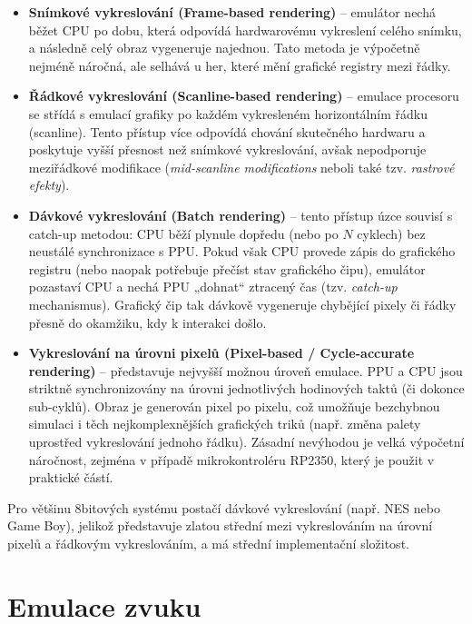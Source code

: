 \begin{itemize}
    \item \textbf{Snímkové vykreslování (Frame-based rendering)} -- emulátor nechá běžet CPU po
        dobu, která odpovídá hardwarovému vykreslení celého snímku, a následně celý obraz vygeneruje
        najednou. Tato metoda je výpočetně nejméně náročná, ale selhává u her, které mění grafické
        registry mezi řádky.
    \item \textbf{Řádkové vykreslování (Scanline-based rendering)} -- emulace procesoru se střídá s
        emulací grafiky po každém vykresleném horizontálním řádku (scanline). Tento přístup více
        odpovídá chování skutečného hardwaru a poskytuje vyšší přesnost než snímkové vykreslování,
        avšak nepodporuje meziřádkové modifikace (\textit{mid-scanline modifications} neboli také
        tzv. \emph{rastrové efekty}).
    \item \textbf{Dávkové vykreslování (Batch rendering)} -- tento přístup úzce souvisí s catch-up
        metodou: CPU běží plynule dopředu (nebo po $N$ cyklech) bez neustálé synchronizace s
        PPU. Pokud však CPU provede zápis do grafického registru (nebo naopak potřebuje přečíst stav
        grafického čipu), emulátor pozastaví CPU a nechá PPU „dohnat“ ztracený čas (tzv.
        \textit{catch-up} mechanismus). Grafický čip tak dávkově vygeneruje chybějící pixely či
        řádky přesně do okamžiku, kdy k interakci došlo.
    \item \textbf{Vykreslování na úrovni pixelů (Pixel-based / Cycle-accurate rendering)} --
        představuje nejvyšší možnou úroveň emulace. PPU a CPU jsou striktně synchronizovány na
        úrovni jednotlivých hodinových taktů (či dokonce sub-cyklů). Obraz je generován pixel po
        pixelu, což umožňuje bezchybnou simulaci i těch nejkomplexnějších grafických triků (např.
        změna palety uprostřed vykreslování jednoho řádku). Zásadní nevýhodou je velká výpočetní
        náročnost, zejména v případě mikrokontroléru RP2350, který je použit v praktické částí.
\end{itemize}

Pro většinu 8bitových systému postačí dávkové vykreslování (např. NES nebo Game Boy), jelikož
představuje zlatou střední mezi vykreslováním na úrovní pixelů a řádkovým vykreslováním, a má
střední implementační složitost.

\section{Emulace zvuku}

